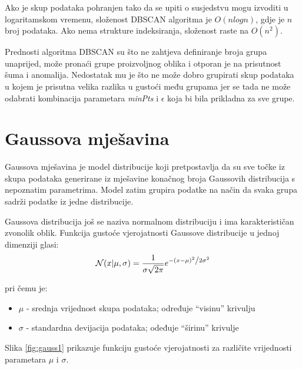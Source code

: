 \documentclass[utf8, diplomski, numeric]{fer}
\begin{document}
Ako je skup podataka pohranjen tako da se upiti o susjedstvu mogu izvoditi u logaritamskom vremenu, složenost DBSCAN algoritma je $O(n log n)$, gdje je $n$ broj podataka. Ako nema strukture indeksiranja, složenost raste na $O(n^2)$.

Prednosti algoritma DBSCAN su što ne zahtjeva definiranje broja grupa unaprijed, može pronaći grupe proizvoljnog oblika i otporan je na prisutnost šuma i anomalija. Nedostatak mu je što ne može dobro grupirati skup podataka u kojem je prisutna velika razlika u gustoći među grupama jer se tada ne može odabrati kombinacija parametara \textit{minPts} i $\epsilon$ koja bi bila prikladna za sve grupe. 

\section{Gaussova mješavina}

Gaussova mješavina je model distribucije koji pretpostavlja da su sve točke iz skupa podataka generirane iz mješavine konačnog broja Gaussovih distribucija s nepoznatim parametrima. Model zatim grupira podatke na način da svaka grupa sadrži podatke iz jedne distribucije.

Gaussova distribucija još se naziva normalnom distribuciju i ima karakterističan zvonolik oblik. Funkcija gustoće vjerojatnosti Gaussove distribucije u jednoj dimenziji glasi:
\begin{equation} \label{eq:gauss1}
\mathcal{N}(x|\mu,\sigma) = \frac{1}{{\sigma \sqrt {2\pi } }}e^{{{ - \left( {x - \mu } \right)^2 } \mathord{\left/ {\vphantom {{ - \left( {x - \mu } \right)^2 } {2\sigma ^2 }}} \right. \kern-\nulldelimiterspace} {2\sigma ^2 }}}
\end{equation}

pri čemu je:
\begin{itemize}
\item $\mu$ - srednja vrijednost skupa podataka; određuje ``visinu'' krivulju
\item $\sigma$ - standardna devijacija podataka; odeđuje ``širinu'' krivulje
\end{itemize}

Slika \ref{fig:gauss1} prikazuje funkciju gustoće vjerojatnosti za različite vrijednosti parametara $\mu$ i $\sigma$.
\end{document}

